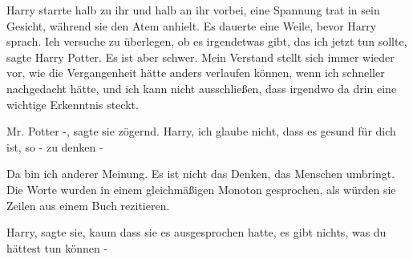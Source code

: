 Harry starrte halb zu ihr und halb an ihr vorbei, eine Spannung trat in sein
Gesicht, während sie den Atem anhielt. Es dauerte eine Weile, bevor Harry
sprach. \glqq{}Ich versuche zu überlegen, ob es irgendetwas gibt, das ich jetzt
tun sollte\grqq{}, sagte Harry Potter. \glqq{}Es ist aber schwer. Mein Verstand
stellt sich immer wieder vor, wie die Vergangenheit hätte anders verlaufen
können, wenn ich schneller nachgedacht hätte, und ich kann nicht ausschließen,
dass irgendwo da drin eine wichtige Erkenntnis steckt.\grqq{}

\glqq{}Mr. Potter -\grqq{}, sagte sie zögernd. \glqq{}Harry, ich glaube nicht,
dass es gesund für dich ist, so - zu denken -\grqq{}

\glqq{}Da bin ich anderer Meinung. Es ist nicht das Denken, das Menschen
umbringt.\grqq{} Die Worte wurden in einem gleichmäßigen Monoton gesprochen, als
würden sie Zeilen aus einem Buch rezitieren.

\glqq{}Harry\grqq{}, sagte sie, kaum dass sie es ausgesprochen hatte, \glqq{}es
gibt nichts, was du hättest tun können -\grqq{}

